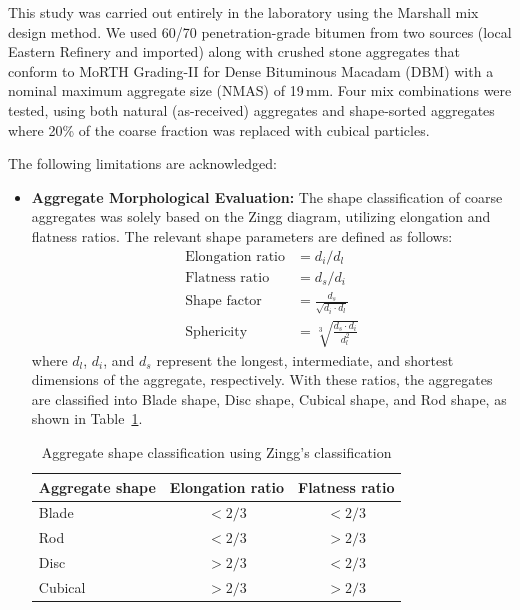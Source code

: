 \documentclass[12pt,a4paper]{article}
\begin{document}
This study was carried out entirely in the laboratory using the Marshall mix design method. We used 60/70 penetration-grade bitumen from two sources (local Eastern Refinery and imported) along with crushed stone aggregates that conform to MoRTH Grading-II for Dense Bituminous Macadam (DBM) with a nominal maximum aggregate size (NMAS) of 19\,mm. Four mix combinations were tested, using both natural (as-received) aggregates and shape-sorted aggregates where 20\% of the coarse fraction was replaced with cubical particles.

The following limitations are acknowledged:
\begin{itemize}
    \item \textbf{Aggregate Morphological Evaluation:} The shape classification of coarse aggregates was solely based on the Zingg diagram, utilizing elongation and flatness ratios. The relevant shape parameters are defined as follows:
    \begin{align*}
        \text{Elongation ratio} &= d_i / d_l \\
        \text{Flatness ratio} &= d_s / d_i \\
        \text{Shape factor} &= \frac{d_s}{\sqrt{d_i \cdot d_l}} \\
        \text{Sphericity} &= \sqrt[3]{\frac{d_s \cdot d_i}{d_l^2}}
    \end{align*}
    where $d_l$, $d_i$, and $d_s$ represent the longest, intermediate, and shortest dimensions of the aggregate, respectively. With these ratios, the aggregates are classified into Blade shape, Disc shape, Cubical shape, and Rod shape, as shown in Table~\ref{tab:shape_classification_limitations}.
    
    \begin{table}[H]
        \centering
        \caption{Aggregate shape classification using Zingg's classification}
        \label{tab:shape_classification_limitations}
        \begin{tabular}{@{}lcc@{}}
            \toprule
            \textbf{Aggregate shape} & \textbf{Elongation ratio} & \textbf{Flatness ratio} \\
            \midrule
            Blade & $< 2/3$ & $< 2/3$ \\
            Rod & $< 2/3$ & $> 2/3$ \\
            Disc & $> 2/3$ & $< 2/3$ \\
            Cubical & $> 2/3$ & $> 2/3$ \\
            \bottomrule
        \end{tabular}
    \end{table}


\end{itemize}
\end{document}

